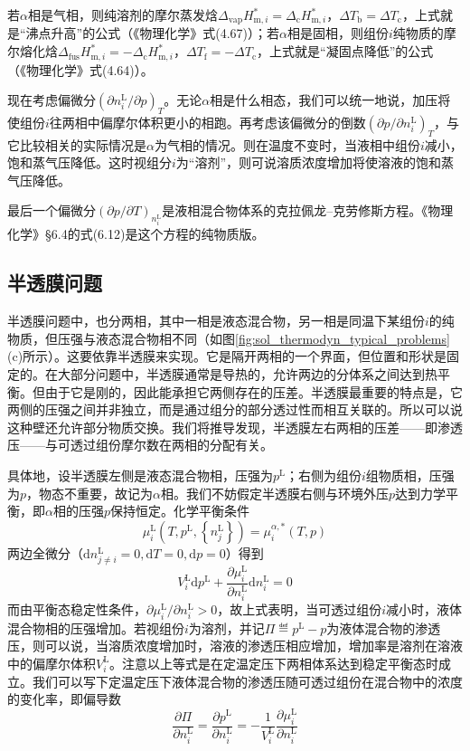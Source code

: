 \documentclass[main.tex]{subfiles}
\begin{document}
若$\alpha$相是气相，则纯溶剂的摩尔蒸发焓$\Delta_\text{vap}H_{\text{m},i}^*=\Delta_\text{c}H_{\text{m},i}^*$，$\Delta T_\text{b}=\Delta T_\text{c}$，上式就是“沸点升高”的公式（《物理化学》式(4.67)）；若$\alpha$相是固相，则组份$i$纯物质的摩尔熔化焓$\Delta_\text{fus}H_{\text{m},i}^*=-\Delta_\text{c}H_{\text{m},i}^*$，$\Delta T_\text{f}=-\Delta T_\text{c}$，上式就是“凝固点降低”的公式（《物理化学》式(4.64)）。

现在考虑偏微分$\left(\partial n_i^\text{L}/\partial p\right)_T$。无论$\alpha$相是什么相态，我们可以统一地说，加压将使组份$i$往两相中偏摩尔体积更小的相跑。再考虑该偏微分的倒数$\left(\partial p/\partial n_i^\text{L}\right)_T$，与它比较相关的实际情况是$\alpha$为气相的情况。则在温度不变时，当液相中组份$i$减小，饱和蒸气压降低。这时视组分$i$为“溶剂”，则可说溶质浓度增加将使溶液的饱和蒸气压降低。

最后一个偏微分$\left(\partial p/\partial T\right)_{n_i^\text{L}}$是液相混合物体系的克拉佩龙--克劳修斯方程。《物理化学》\S6.4的式(6.12)是这个方程的纯物质版。

\subsection{半透膜问题}
半透膜问题中，也分两相，其中一相是液态混合物，另一相是同温下某组份$i$的纯物质，但压强与液态混合物相不同（如图\ref{fig:sol_thermodyn_typical_problems}(c)所示）。这要依靠半透膜来实现。它是隔开两相的一个界面，但位置和形状是固定的。在大部分问题中，半透膜通常是导热的，允许两边的分体系之间达到热平衡。但由于它是刚的，因此能承担它两侧存在的压差。半透膜最重要的特点是，它两侧的压强之间并非独立，而是通过组分的部分透过性而相互关联的。所以可以说这种壁还允许部分物质交换。我们将推导发现，半透膜左右两相的压差——即渗透压——与可透过组份摩尔数在两相的分配有关。

具体地，设半透膜左侧是液态混合物相，压强为$p^\text{L}$；右侧为组份$i$组物质相，压强为$p$，物态不重要，故记为$\alpha$相。我们不妨假定半透膜右侧与环境外压$p$达到力学平衡，即$\alpha$相的压强$p$保持恒定。化学平衡条件
\[\mu_i^\text{L}\left(T,p^\text{L},\left\{n_j^\text{L}\right\}\right)=\mu_i^{\alpha,*}\left(T,p\right)\]
两边全微分（$\mathrm{d}n_{j\neq i}^\text{L}=0,\mathrm{d}T=0,\mathrm{d}p=0$）得到
\[V_i^\text{L}\mathrm{d}p^\text{L}+\frac{\partial \mu_i^\text{L}}{\partial n_i^\text{L}}\mathrm{d}n_i^\text{L}=0\]
而由平衡态稳定性条件，$\partial\mu_i^\text{L}/\partial n_i^\text{L}>0$，故上式表明，当可透过组份$i$减小时，液体混合物相的压强增加。若视组份$i$为溶剂，并记$\Pi\eqdef p^\text{L}-p$为液体混合物的渗透压，则可以说，当溶质浓度增加时，溶液的渗透压相应增加，增加率是溶剂在溶液中的偏摩尔体积$V_i^\text{L}$。注意以上等式是在定温定压下两相体系达到稳定平衡态时成立。我们可以写下定温定压下液体混合物的渗透压随可透过组份在混合物中的浓度的变化率，即偏导数
\begin{equation}\label{eq:II.5_osmotic_pressure_partial_derivative}
    \frac{\partial\Pi}{\partial n_i^\text{L}}=\frac{\partial p^\text{L}}{\partial n_i^\text{L}}=-\frac{1}{V_i^\text{L}}\frac{\partial\mu_i^\text{L}}{\partial n_i^\text{L}}
\end{equation}
\end{document}
